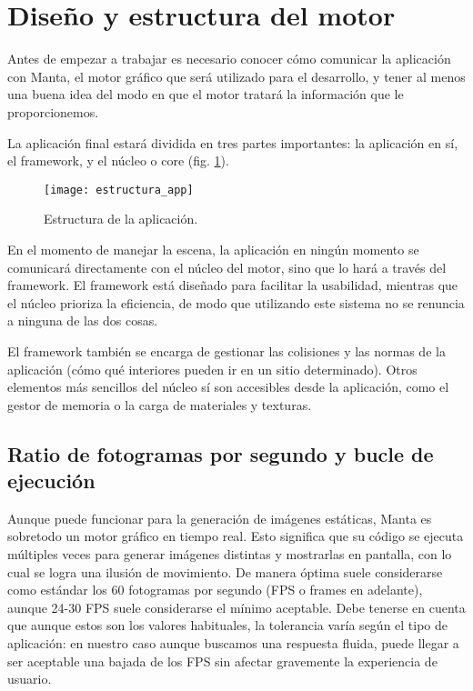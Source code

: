 \section{Diseño y estructura del motor}
\label{engine_design}
Antes de empezar a trabajar es necesario conocer cómo comunicar la aplicación con Manta, el motor gráfico que será utilizado para el desarrollo, y tener al menos una buena idea del modo en que el motor tratará la información que le proporcionemos.

La aplicación final estará dividida en tres partes importantes: la aplicación en sí, el framework, y el núcleo o core (fig. \ref{fig:estructura_app}).

\begin{figure}[H]
    \centering
    \texttt{[image: estructura\_app]}
    \caption{Estructura de la aplicación.}
    \label{fig:estructura_app}
\end{figure}

En el momento de manejar la escena, la aplicación en ningún momento se comunicará directamente con el núcleo del motor, sino que lo hará a través del framework. El framework está diseñado para facilitar la usabilidad, mientras que el núcleo prioriza la eficiencia, de modo que utilizando este sistema no se renuncia a ninguna de las dos cosas.

El framework también se encarga de gestionar las colisiones y las normas de la aplicación (cómo qué interiores pueden ir en un sitio determinado). Otros elementos más sencillos del núcleo sí son accesibles desde la aplicación, como el gestor de memoria o la carga de materiales y texturas.

\subsection{Ratio de fotogramas por segundo y bucle de ejecución}
\label{fps_bucle_ejecucion}
Aunque puede funcionar para la generación de imágenes estáticas, Manta es sobretodo un motor gráfico en tiempo real. Esto significa que su código se ejecuta múltiples veces para generar imágenes distintas y mostrarlas en pantalla, con lo cual se logra una ilusión de movimiento. De manera óptima suele considerarse como estándar los 60 fotogramas por segundo (FPS o frames en adelante), aunque 24-30 FPS suele considerarse el mínimo aceptable. Debe tenerse en cuenta que aunque estos son los valores habituales, la tolerancia varía según el tipo de aplicación: en nuestro caso aunque buscamos una respuesta fluida, puede llegar a ser aceptable una bajada de los FPS sin afectar gravemente la experiencia de usuario.

